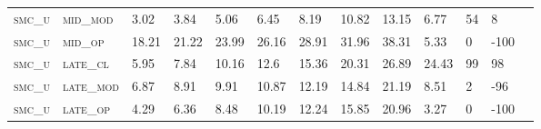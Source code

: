 \begin{landscape}
\begin{table}[!htbp]
\begin{tabular}{@{}lllllllllllll@{}}
\footnotesize \textsc{smc\_u}      & \footnotesize \textsc{mid\_mod  }               & \footnotesize 3.02           & \footnotesize  3.84           & \footnotesize 5.06             & \footnotesize 6.45             & \footnotesize 8.19             & \footnotesize 10.82            & \footnotesize 13.15       & \footnotesize 6.77     & \footnotesize 54      & \footnotesize 8    \\
\footnotesize \textsc{smc\_u}      & \footnotesize \textsc{mid\_op   }               & \footnotesize 18.21          & \footnotesize  21.22          & \footnotesize 23.99            & \footnotesize 26.16            & \footnotesize 28.91            & \footnotesize 31.96            & \footnotesize 38.31       & \footnotesize 5.33     & \footnotesize 0       & \footnotesize -100    \\
\footnotesize \textsc{smc\_u}      & \footnotesize \textsc{late\_cl  }               & \footnotesize 5.95           & \footnotesize  7.84           & \footnotesize 10.16            & \footnotesize 12.6             & \footnotesize 15.36            & \footnotesize 20.31            & \footnotesize 26.89       & \footnotesize 24.43    & \footnotesize 99      & \footnotesize 98    \\
\footnotesize \textsc{smc\_u}      & \footnotesize \textsc{late\_mod }               & \footnotesize 6.87           & \footnotesize  8.91           & \footnotesize 9.91             & \footnotesize 10.87            & \footnotesize 12.19            & \footnotesize 14.84            & \footnotesize 21.19       & \footnotesize 8.51     & \footnotesize 2       & \footnotesize -96    \\
\footnotesize \textsc{smc\_u}      & \footnotesize \textsc{late\_op  }               & \footnotesize 4.29           & \footnotesize  6.36           & \footnotesize 8.48             & \footnotesize 10.19            & \footnotesize 12.24            & \footnotesize 15.85            & \footnotesize 20.96       & \footnotesize 3.27     & \footnotesize 0       & \footnotesize -100    \\
\end{tabular}
\end{table}
\end{landscape}

